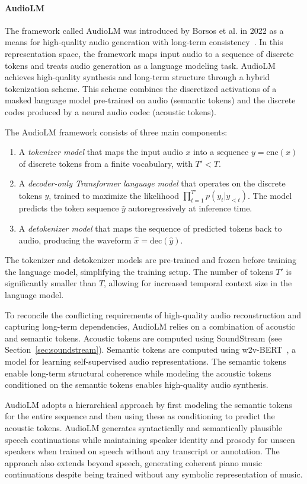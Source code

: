\paragraph{AudioLM} \label{sec:audiolm}

The framework called AudioLM was introduced by Borsos et al. in 2022 as a means for high-quality audio generation with long-term consistency~\cite{borsos_audiolm_2022}. In this representation space, the framework maps input audio to a sequence of discrete tokens and treats audio generation as a language modeling task. AudioLM achieves high-quality synthesis and long-term structure through a hybrid tokenization scheme. This scheme combines the discretized activations of a masked language model pre-trained on audio (semantic tokens) and the discrete codes produced by a neural audio codec (acoustic tokens).

The AudioLM framework consists of three main components:

\begin{enumerate}
	\item A \textit{tokenizer model} that maps the input audio $x$ into a sequence $y = \text{enc}(x)$ of discrete tokens from a finite vocabulary, with $T' < T$.
	\item A \textit{decoder-only Transformer language model} that operates on the discrete tokens $y$, trained to maximize the likelihood $\prod_{t=1}^{T'} p(y_t|y_{<t})$. The model predicts the token sequence $\hat{y}$ autoregressively at inference time.
	\item A \textit{detokenizer model} that maps the sequence of predicted tokens back to audio, producing the waveform $\hat{x} = \text{dec}(\hat{y})$.
\end{enumerate}

The tokenizer and detokenizer models are pre-trained and frozen before training the language model, simplifying the training setup. The number of tokens $T'$ is significantly smaller than $T$, allowing for increased temporal context size in the language model.

To reconcile the conflicting requirements of high-quality audio reconstruction and capturing long-term dependencies, AudioLM relies on a combination of acoustic and semantic tokens. Acoustic tokens are computed using SoundStream (see Section~\ref{sec:soundstream}). Semantic tokens are computed using w2v-BERT~\cite{chung_w2v-bert_2021}, a model for learning self-supervised audio representations. The semantic tokens enable long-term structural coherence while modeling the acoustic tokens conditioned on the semantic tokens enables high-quality audio synthesis.

AudioLM adopts a hierarchical approach by first modeling the semantic tokens for the entire sequence and then using these as conditioning to predict the acoustic tokens. AudioLM generates syntactically and semantically plausible speech continuations while maintaining speaker identity and prosody for unseen speakers when trained on speech without any transcript or annotation. The approach also extends beyond speech, generating coherent piano music continuations despite being trained without any symbolic representation of music.